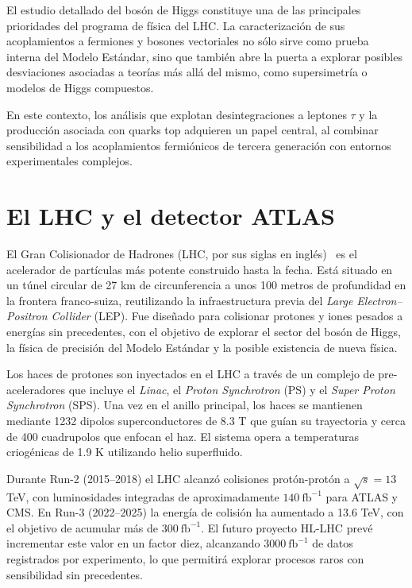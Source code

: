 El estudio detallado del bosón de Higgs constituye una de las principales prioridades del programa de física del LHC. La caracterización de sus acoplamientos a fermiones y bosones vectoriales no sólo sirve como prueba interna del Modelo Estándar, sino que también abre la puerta a explorar posibles desviaciones asociadas a teorías más allá del mismo, como supersimetría o modelos de Higgs compuestos.  

En este contexto, los análisis que explotan desintegraciones a leptones $\tau$ y la producción asociada con quarks top adquieren un papel central, al combinar sensibilidad a los acoplamientos fermiónicos de tercera generación con entornos experimentales complejos. 


\section*{El LHC y el detector ATLAS}

El Gran Colisionador de Hadrones (LHC, por sus siglas en inglés)~\cite{Evans:1129806, Bruning:782076} es el acelerador de partículas más potente construido hasta la fecha. Está situado en un túnel circular de 27 km de circunferencia a unos 100 metros de profundidad en la frontera franco-suiza, reutilizando la infraestructura previa del \textit{Large Electron–Positron Collider} (LEP). Fue diseñado para colisionar protones y iones pesados a energías sin precedentes, con el objetivo de explorar el sector del bosón de Higgs, la física de precisión del Modelo Estándar y la posible existencia de nueva física.

Los haces de protones son inyectados en el LHC a través de un complejo de pre-aceleradores que incluye el \textit{Linac}, el \textit{Proton Synchrotron} (PS) y el \textit{Super Proton Synchrotron} (SPS). Una vez en el anillo principal, los haces se mantienen mediante 1232 dipolos superconductores de 8.3 T que guían su trayectoria y cerca de 400 cuadrupolos que enfocan el haz. El sistema opera a temperaturas criogénicas de 1.9 K utilizando helio superfluido. 

Durante Run-2 (2015–2018) el LHC alcanzó colisiones protón-protón a $\sqrt{s} = 13$ TeV, con luminosidades integradas de aproximadamente $140~\text{fb}^{-1}$ para ATLAS y CMS. En Run-3 (2022–2025) la energía de colisión ha aumentado a 13.6 TeV, con el objetivo de acumular más de $300~\text{fb}^{-1}$. El futuro proyecto HL-LHC prevé incrementar este valor en un factor diez, alcanzando $3000~\text{fb}^{-1}$ de datos registrados por experimento, lo que permitirá explorar procesos raros con sensibilidad sin precedentes.

